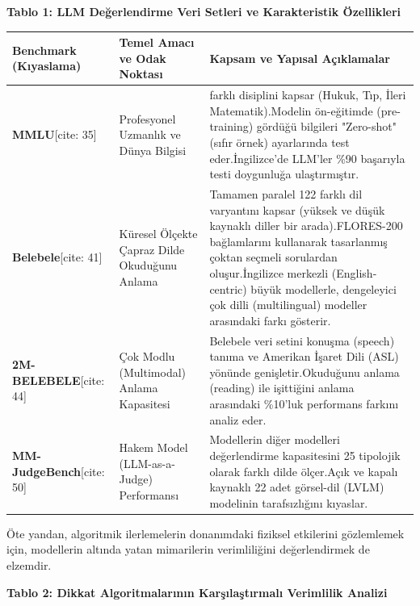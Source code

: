 \documentclass[11pt,a4paper]{article}
\begin{document}
\textbf{Tablo 1: LLM Değerlendirme Veri Setleri ve Karakteristik Özellikleri}

\begin{longtable}{>{\raggedright\arraybackslash}p{}>{\raggedright\arraybackslash}p{}>{\raggedright\arraybackslash}p{}}
\toprule
\textbf{Benchmark (Kıyaslama)} & \textbf{Temel Amacı ve Odak Noktası} & \textbf{Kapsam ve Yapısal Açıklamalar} \\
\midrule
\endhead
\textbf{MMLU}[cite: 35] & Profesyonel Uzmanlık ve Dünya Bilgisi & 57 farklı disiplini kapsar (Hukuk, Tıp, İleri Matematik).Modelin ön-eğitimde (pre-training) gördüğü bilgileri "Zero-shot" (sıfır örnek) ayarlarında test eder.İngilizce'de LLM'ler \%90 başarıyla testi doygunluğa ulaştırmıştır. \\
\textbf{Belebele}[cite: 41] & Küresel Ölçekte Çapraz Dilde Okuduğunu Anlama & Tamamen paralel 122 farklı dil varyantını kapsar (yüksek ve düşük kaynaklı diller bir arada).FLORES-200 bağlamlarını kullanarak tasarlanmış çoktan seçmeli sorulardan oluşur.İngilizce merkezli (English-centric) büyük modellerle, dengeleyici çok dilli (multilingual) modeller arasındaki farkı gösterir. \\
\textbf{2M-BELEBELE}[cite: 44] & Çok Modlu (Multimodal) Anlama Kapasitesi & Belebele veri setini konuşma (speech) tanıma ve Amerikan İşaret Dili (ASL) yönünde genişletir.Okuduğunu anlama (reading) ile işittiğini anlama arasındaki \%10'luk performans farkını analiz eder. \\
\textbf{MM-JudgeBench}[cite: 50] & Hakem Model (LLM-as-a-Judge) Performansı & Modellerin diğer modelleri değerlendirme kapasitesini 25 tipolojik olarak farklı dilde ölçer.Açık ve kapalı kaynaklı 22 adet görsel-dil (LVLM) modelinin tarafsızlığını kıyaslar. \\
\bottomrule
\end{longtable}
Öte yandan, algoritmik ilerlemelerin donanımdaki fiziksel etkilerini gözlemlemek için, modellerin altında yatan mimarilerin verimliliğini değerlendirmek de elzemdir.

\textbf{Tablo 2: Dikkat Algoritmalarının Karşılaştırmalı Verimlilik Analizi}
\end{document}
